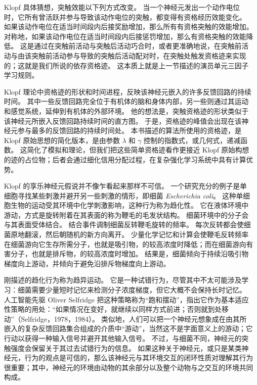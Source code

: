 \documentclass[UTF8,12pt,a4paper,fontset=fandol]{ctexart}
\begin{document}
Klopf 具体猜想，突触效能以下列方式改变。
当一个神经元发出一个动作电位时，它所有曾活跃并参与导致该动作电位的突触，都变得有资格经历效能变化。
如果该动作电位在适当时间段内后接奖励增加，那么所有有资格突触的效能增加。
对称地，如果该动作电位在适当时间段内后接惩罚增加，那么有资格突触的效能降低。
这是通过在突触前活动与突触后活动巧合时，或者更准确地说，在突触前活动与由该突触前活动参与导致的突触后活动配对时，在突触处触发资格迹来实现的；这就是我们所说的依存资格迹。
这本质上就是上一节描述的演员单元三因子学习规则。

Klopf 理论中资格迹的形状和时间进程，反映该神经元嵌入的许多反馈回路的持续时间。
其中一些反馈回路完全位于有机体的脑和身体内部，另一些则通过其运动和感觉系统，延伸到有机体的外部环境。
他的想法是，突触资格迹的形状类似于该神经元所嵌入反馈回路持续时间的直方图。
于是，资格迹的峰值会出现在该神经元参与最多的反馈回路的持续时间处。
本书描述的算法所使用的资格迹，是 Klopf 原始思想的简化版本，是由参数 $\lambda$ 和 $\gamma$ 控制的指数式，或几何式，递减函数。
这简化了模拟和理论，但我们把这些简单资格迹看作更接近 Klopf 原始构想的迹的占位物；后者会通过细化信用分配过程，在复杂强化学习系统中具有计算优势。

Klopf 的享乐神经元假说并不像乍看起来那样不可信。
一个研究充分的例子是单细胞寻找某些刺激并避开另一些刺激的情形，即细菌 \textit{Escherichia coli}。
这种单细胞生物的运动受其环境中化学刺激影响，这种行为称为趋化性。
它在液体环境中游动，方式是旋转附着在其表面的称为鞭毛的毛发状结构。
细菌环境中的分子会与其表面受体结合。
结合事件调制细菌反转鞭毛旋转的频率。
每次反转都会使细菌原地翻滚，然后朝随机的新方向离开。
少量化学记忆和计算会使鞭毛反转频率在细菌游向它生存所需分子，也就是吸引物，的较高浓度时降低；而在细菌游向有害分子，也就是排斥物，的较高浓度时增加。
结果是，细菌倾向于持续沿吸引物梯度向上游动，并倾向于避免沿排斥物梯度向上游动。

刚描述的趋化行为称为趋异运动。
它是一种试错行为，尽管其中不太可能涉及学习：细菌需要少量短时记忆来检测分子浓度梯度，但它大概不会保持长时记忆。
人工智能先驱 Oliver Selfridge 把这种策略称为“跑和摆动”，指出它作为基本适应性策略的用处：“如果情况在变好，就继续以同样方式前进；否则就到处移动”（Selfridge，1978，1984）。
类似地，人们可以把一个神经元想象成在由其所嵌入的复杂反馈回路集合组成的介质中“游动”，当然这不是字面意义上的游动；它行动以获得一种输入信号并避开其他输入信号。
不过，与细菌不同，神经元的突触强度会保留关于其过去试错行为的信息。
如果这种关于神经元，或只是某类神经元，行为的观点是可信的，那么该神经元与其环境交互的闭环性质对理解其行为很重要；其中，神经元的环境由动物的其余部分以及整个动物与之交互的环境共同构成。
\end{document}
